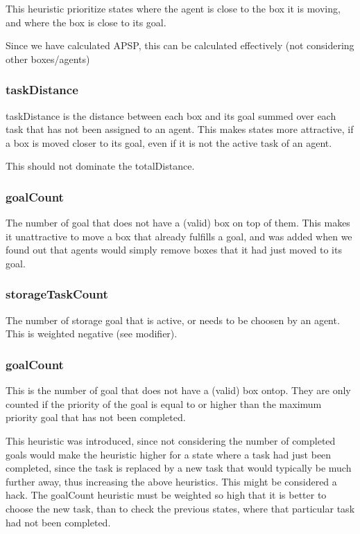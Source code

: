 \documentclass[letterpaper]{article}
\begin{document}
This heuristic prioritize states where the agent is close to the box it is moving,
and where the box is close to its goal.

Since we have calculated APSP, this can be calculated effectively (not considering other boxes/agents)\\

\subsubsection{taskDistance}
taskDistance is the distance between each box and its goal summed over each task
that has not been assigned to an agent. This makes states more attractive, if
a box is moved closer to its goal, even if it is not the active task of an agent.

This should not dominate the totalDistance.

\subsubsection{goalCount}
The number of goal that does not have a (valid) box on top of them. This makes it
unattractive to move a box that already fulfills a goal, and was added when we found
out that agents would simply remove boxes that it had just moved to its goal.

\subsubsection{storageTaskCount}
The number of storage goal that is active, or needs to be choosen by an agent.
This is weighted negative (see modifier).

\subsubsection{goalCount}
This is the number of goal that does not have a (valid) box ontop. They are only
counted if the priority of the goal is equal to or higher than the maximum priority
goal that has not been completed.

This heuristic was introduced, since not considering the number of completed goals
would make the heuristic higher for a state where a task had just been completed,
since the task is replaced by a new task that would typically be much further away,
thus increasing the above heuristics. This might be considered a hack. The goalCount
heuristic must be weighted so high that it is better to choose the new task, than to
check the previous states, where that particular task had not been completed.
\end{document}
